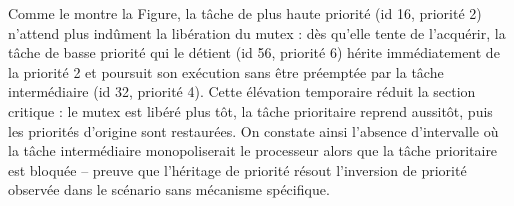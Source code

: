 \documentclass{latexPackage/utc-report/utc-report}
\begin{document}
Comme le montre la Figure, la tâche de plus haute priorité (id 16, priorité 2) n’attend plus indûment la libération du mutex : dès qu’elle tente de l’acquérir, la tâche de basse priorité qui le détient (id 56, priorité 6) hérite immédiatement de la priorité 2 et poursuit son exécution sans être préemptée par la tâche intermédiaire (id 32, priorité 4). Cette élévation temporaire réduit la section critique : le mutex est libéré plus tôt, la tâche prioritaire reprend aussitôt, puis les priorités d’origine sont restaurées. On constate ainsi l’absence d’intervalle où la tâche intermédiaire monopoliserait le processeur alors que la tâche prioritaire est bloquée – preuve que l’héritage de priorité résout l’inversion de priorité observée dans le scénario sans mécanisme spécifique.

\pagebreak
\end{document}

